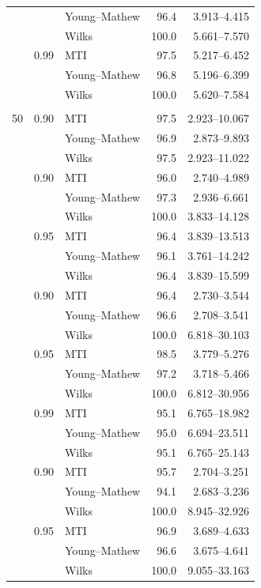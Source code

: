 \begin{longtable}{@{}rrlrr@{}}
 &  & Young--Mathew & 96.4 & 3.913--4.415 \\
 &  & Wilks & 100.0 & 5.661--7.570 \\
\addlinespace[0.25em]
1000 & 0.99 & MTI & 97.5 & 5.217--6.452 \\
 &  & Young--Mathew & 96.8 & 5.196--6.399 \\
 &  & Wilks & 100.0 & 5.620--7.584 \\
\addlinespace[0.25em]
\multicolumn{5}{@{}l}{\textit{Student t(3)}}\\
50 & 0.90 & MTI & 97.5 & 2.923--10.067 \\
 &  & Young--Mathew & 96.9 & 2.873--9.893 \\
 &  & Wilks & 97.5 & 2.923--11.022 \\
\addlinespace[0.25em]
100 & 0.90 & MTI & 96.0 & 2.740--4.989 \\
 &  & Young--Mathew & 97.3 & 2.936--6.661 \\
 &  & Wilks & 100.0 & 3.833--14.128 \\
\addlinespace[0.25em]
100 & 0.95 & MTI & 96.4 & 3.839--13.513 \\
 &  & Young--Mathew & 96.1 & 3.761--14.242 \\
 &  & Wilks & 96.4 & 3.839--15.599 \\
\addlinespace[0.25em]
500 & 0.90 & MTI & 96.4 & 2.730--3.544 \\
 &  & Young--Mathew & 96.6 & 2.708--3.541 \\
 &  & Wilks & 100.0 & 6.818--30.103 \\
\addlinespace[0.25em]
500 & 0.95 & MTI & 98.5 & 3.779--5.276 \\
 &  & Young--Mathew & 97.2 & 3.718--5.466 \\
 &  & Wilks & 100.0 & 6.812--30.956 \\
\addlinespace[0.25em]
500 & 0.99 & MTI & 95.1 & 6.765--18.982 \\
 &  & Young--Mathew & 95.0 & 6.694--23.511 \\
 &  & Wilks & 95.1 & 6.765--25.143 \\
\addlinespace[0.25em]
1000 & 0.90 & MTI & 95.7 & 2.704--3.251 \\
 &  & Young--Mathew & 94.1 & 2.683--3.236 \\
 &  & Wilks & 100.0 & 8.945--32.926 \\
\addlinespace[0.25em]
1000 & 0.95 & MTI & 96.9 & 3.689--4.633 \\
 &  & Young--Mathew & 96.6 & 3.675--4.641 \\
 &  & Wilks & 100.0 & 9.055--33.163 \\

\end{longtable}
